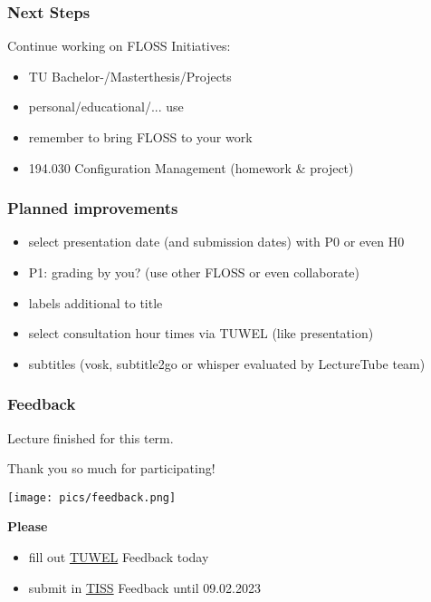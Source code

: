 \begin{frame}
	\frametitle{Next Steps}

	Continue working on FLOSS Initiatives:

	\begin{itemize}[<+-| alert@+>]
	\item TU Bachelor-/Masterthesis/Projects
	\item personal/educational/... use
	\item remember to bring FLOSS to your work
	\item 194.030 Configuration Management (homework \& project)
	\end{itemize}
\end{frame}

\begin{frame}
	\frametitle{Planned improvements}

	\begin{itemize}[<+-| alert@+>]
		\item select presentation date (and submission dates) with P0 or even H0
		\item P1: grading by you? (use other FLOSS or even collaborate)
		\item labels additional to title
		\item select consultation hour times via TUWEL (like presentation)
		\item subtitles (vosk, subtitle2go or whisper evaluated by LectureTube team)
	\end{itemize}
\end{frame}

\begin{frame}
	\frametitle{Feedback}
	Lecture finished for this term.

	Thank you so much for participating!

	\hfill \texttt{[image: pics/feedback.png]}
	\vspace{-1cm}

	\textbf{Please}
	\begin{itemize}
		\item fill out \href{https://tuwel.tuwien.ac.at/mod/feedback/view.php?id=1661074}{TUWEL} Feedback today
		\item submit in \href{https://tiss.tuwien.ac.at/survey/surveyForm.xhtml?courseNumber=194114&semesterCode=2022W}{TISS} Feedback until 09.02.2023
	\end{itemize}
\end{frame}

%
%	
%	



